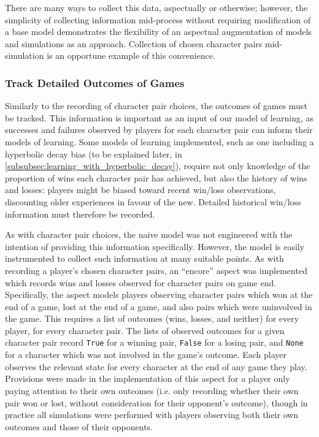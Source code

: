 There are many ways to collect this data, aspectually or otherwise; however, the simplicity of collecting information mid-process
without requiring modification of a base model demonstrates the flexibility of an aspectual augmentation of models and simulations
as an approach. Collection of chosen character pairs mid-simulation is an opportune example of this convenience.

\subsubsection{Track Detailed Outcomes of Games}\label{subsubsec:detailed_game_outcome_tracking_aspect}
Similarly to the recording of character pair choices, the outcomes of games must be tracked. This information
is important as an input of our model of learning, as successes and failures observed by players for each character pair
can inform their models of learning. Some models of learning implemented, such as one including a hyperbolic decay bias
(to be explained later, in \cref{subsubsec:learning_with_hyperbolic_decay}), require not only knowledge of the proportion of wins
each character pair has achieved, but also the history of wins and losses: players might be biased toward recent win/loss observations,
discounting older experiences in favour of the new. Detailed historical win/loss information must therefore be recorded.

As with character pair choices, the naive model was not engineered with the intention of providing this information specifically.
However, the model is easily instrumented to collect such information at many suitable points. As with recording
a player's chosen character pairs, an ``encore'' aspect was implemented which records wins and losses observed for character pairs
on game end. Specifically, the aspect models players observing character pairs which won at the end of a game, lost at the end of
a game, and also pairs which were uninvolved in the game. This requires a list of outcomes (wins, losses, and neither) for every player, for every character pair.
The lists of observed outcomes for a given character pair record 
\lstinline{True} for a winning pair, \lstinline{False} for a losing pair, and \lstinline{None} for a character which was not
involved in the game's outcome. Each player observes the relevant state for every character at the end of any game they play. 
Provisions were made in the implementation of this aspect for a player only paying attention to
their own outcomes (i.e. only recording whether their own pair won or lost, without consideration for their opponent's outcome),
though in practice all simulations were performed with players observing both their own outcomes and those of their opponents.

